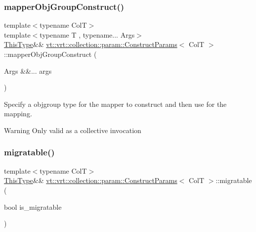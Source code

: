 \subsubsection{\texorpdfstring{mapper\+Obj\+Group\+Construct()}{mapperObjGroupConstruct()}}
{\footnotesize\ttfamily template$<$typename ColT$>$ \\
template$<$typename T , typename... Args$>$ \\
\hyperlink{structvt_1_1vrt_1_1collection_1_1param_1_1_construct_params_a13d4910c0f6825c7b0ddfebce5288bea}{This\+Type}\&\& \hyperlink{structvt_1_1vrt_1_1collection_1_1param_1_1_construct_params}{vt\+::vrt\+::collection\+::param\+::\+Construct\+Params}$<$ ColT $>$\+::mapper\+Obj\+Group\+Construct (\begin{DoxyParamCaption}\item[{Args \&\&...}]{args }\end{DoxyParamCaption})\hspace{0.3cm}{\ttfamily [inline]}}



Specify a objgroup type for the mapper to construct and then use for the mapping. 

\begin{DoxyWarning}{Warning}
Only valid as a collective invocation 
\end{DoxyWarning}
\mbox{\label{structvt_1_1vrt_1_1collection_1_1param_1_1_construct_params_ae84568f9ea86b3b5a5aa86eca8962db0}} 
\subsubsection{\texorpdfstring{migratable()}{migratable()}}
{\footnotesize\ttfamily template$<$typename ColT$>$ \\
\hyperlink{structvt_1_1vrt_1_1collection_1_1param_1_1_construct_params_a13d4910c0f6825c7b0ddfebce5288bea}{This\+Type}\&\& \hyperlink{structvt_1_1vrt_1_1collection_1_1param_1_1_construct_params}{vt\+::vrt\+::collection\+::param\+::\+Construct\+Params}$<$ ColT $>$\+::migratable (\begin{DoxyParamCaption}\item[{bool}]{is\+\_\+migratable }\end{DoxyParamCaption})\hspace{0.3cm}{\ttfamily [inline]}}



